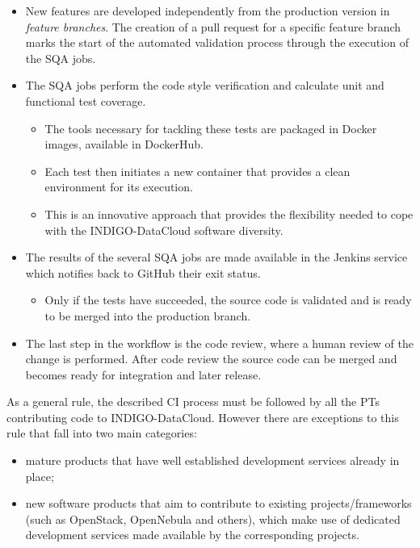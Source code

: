 \documentclass{article}
\begin{document}
\begin{itemize}
    \item New features are developed independently from the
          production version in \textit{feature branches}. The creation of
          a pull request for a specific feature branch marks the start of
          the automated validation process through the execution of the
          SQA jobs.

    \item The SQA jobs perform the code style verification and calculate unit
        and functional test coverage.
        \begin{itemize}
            \item The tools necessary for tackling these tests are packaged in
                Docker images, available in DockerHub.
            \item Each test then initiates a new container that provides a
                clean environment for its execution.
            \item This is an innovative approach that provides the flexibility
                needed to cope with the INDIGO-DataCloud software diversity.
        \end{itemize}

    \item The results of the several SQA jobs are made available in the Jenkins
        service which notifies back to GitHub their exit status.
        \begin{itemize}
            \item Only if the tests have succeeded, the source code is
                validated and is ready to be merged into the production branch.
        \end{itemize}

    \item The last step in the workflow is the code review, where a human
        review of the change is performed. After code review the source code
        can be merged and becomes ready for integration and later release.
\end{itemize}



As a general rule, the described CI process must be followed by all the PTs
contributing code to INDIGO-DataCloud. However there are exceptions to this rule that fall into two main categories:

\begin{itemize}
    \item mature products that have well established development services
        already in place;

    \item new software products that aim to contribute to existing
        projects/frameworks (such as OpenStack, OpenNebula and
        others), which make use of dedicated
        development services made available by the corresponding projects.
\end{itemize}
\end{document}
